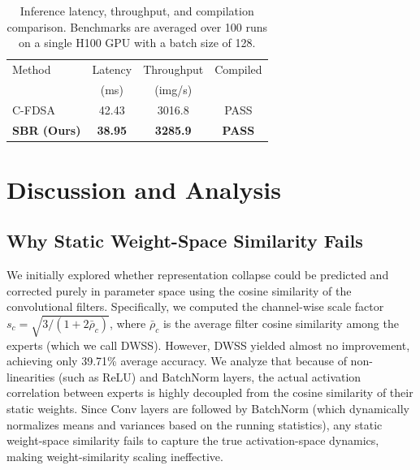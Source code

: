 \documentclass{article}
\theoremstyle{plain}
\theoremstyle{definition}
\theoremstyle{remark}
\begin{document}
\begin{table}[t]
\caption{Inference latency, throughput, and compilation comparison. Benchmarks are averaged over 100 runs on a single H100 GPU with a batch size of 128.}
\label{tab:latency}
\vskip 0.1in
\begin{center}
\begin{scriptsize}
\begin{sc}
\setlength{\tabcolsep}{3pt}
\begin{tabular}{lccc}
\toprule
Method & Latency & Throughput & Compiled \\
 & (ms) & (img/s) & \\
\midrule
C-FDSA & 42.43 & 3016.8 & PASS \\
\textbf{SBR (Ours)} & \textbf{38.95} & \textbf{3285.9} & \textbf{PASS} \\
\bottomrule
\end{tabular}
\end{sc}
\end{scriptsize}
\end{center}
\end{table}

\section{Discussion and Analysis}
\label{sec:discussion}

\subsection{Why Static Weight-Space Similarity Fails}
We initially explored whether representation collapse could be predicted and corrected purely in parameter space using the cosine similarity of the convolutional filters. Specifically, we computed the channel-wise scale factor $s_c = \sqrt{3 / (1 + 2\bar{\rho}_c)}$, where $\bar{\rho}_c$ is the average filter cosine similarity among the experts (which we call DWSS). However, DWSS yielded almost no improvement, achieving only 39.71\% average accuracy.
We analyze that because of non-linearities (such as ReLU) and BatchNorm layers, the actual activation correlation between experts is highly decoupled from the cosine similarity of their static weights. Since Conv layers are followed by BatchNorm (which dynamically normalizes means and variances based on the running statistics), any static weight-space similarity fails to capture the true activation-space dynamics, making weight-similarity scaling ineffective.
\end{document}
